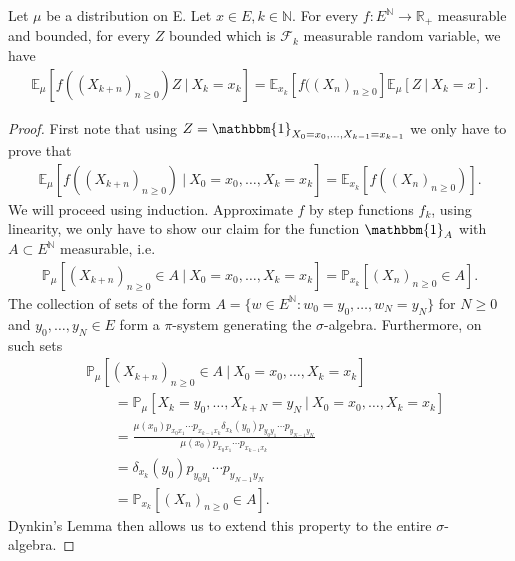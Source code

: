 \begin{theorem}
	Let $\mu$ be a distribution on E. Let $x \in E, k \in \mathbb{N}$. For every $f: E^{\mathbb{N}} \to \mathbb{R}_+$ measurable and bounded, for every $Z$ bounded which is $ \mathcal{F}_k$ measurable random variable, we have
\begin{align}
	\boxed{	\mathbb{E}_\mu \left[ f((X_{k+n})_{n \geq 0})Z \ | \ X_k = x_k \right] = \mathbb{E}_{x_k} \left[ f((X_n)_{n \geq 0} \right] \mathbb{E}_\mu \left[ Z \ | \ X_k=x \right].} 
\end{align}
\end{theorem}
\begin{proof}
	First note that using $Z= \mathbbm{1}_{X_0=x_0, \ldots ,X_{k-1}=x_{k-1}}$ we only have to prove that 
\begin{align}
	\mathbb{E}_{\mu } \left[ f((X_{k+n})_{n\geq 0}) \ | \ X_0=x_0 , \ldots , X_k=x_k \right]= \mathbb{E}_{x_k} \left[ f((X_n)_{n\geq 0}) \right]
.\end{align}
We will proceed using induction. Approximate $f$ by step functions $f_k$, using linearity, we only have to show our claim for the function $\mathbbm{1}_{A} $ with $A \subset E ^{\mathbb{N}}$ measurable, i.e. 
	\begin{align}
	\mathbb{P}_{\mu } \left[ (X_{k+n})_{n\geq 0}\in A \ | \ X_0=x_0, \ldots ,X_k=x_k \right] = \mathbb{P}_{x_k} \left[ (X_n)_{n\geq 0} \in A \right] 
.\end{align}  
The collection of sets of the form $A=\{w \in E^{\mathbb{N}}: w_0=y_0, \ldots ,w_N=y_N\}$ for $N\geq 0$ and $y_0, \ldots ,y_N \in E$ form a $\pi $-system generating the $\sigma$-algebra. Furthermore, on such sets 
\begin{align}
&	\mathbb{P}_{\mu } \left[ (X_{k+n})_{n\geq 0}\in A \ | \ X_0 = x_0, \ldots ,X_k=x_k \right] \\
&\qquad= \mathbb{P}_{\mu} \left[ X_k=y_0, \ldots ,X_{k+N}= y_N \ | \ X_0=x_0, \ldots ,X_k=x_k  \right] \\
&\qquad= \frac{\mu (x_0) p_{x_0x_1} \cdots p_{x_{k-1}x_k} \delta_{x_k}(y_0)p_{y_0y_1} \cdots p_{y_{N-1}y_N}}{\mu (x_0) p_{x_0x_1} \cdots p_{x_{k-1}x_k} } \\
& \qquad= \delta_{x_k}(y_0)p_{y_0y_1} \cdots p_{y_{N-1}y_N} \\
& \qquad= \mathbb{P}_{x_k} \left[ (X_n)_{n\geq 0} \in A \right] 
.\end{align}
Dynkin's Lemma then allows us to extend this property to the entire $\sigma$-algebra.
\end{proof}


